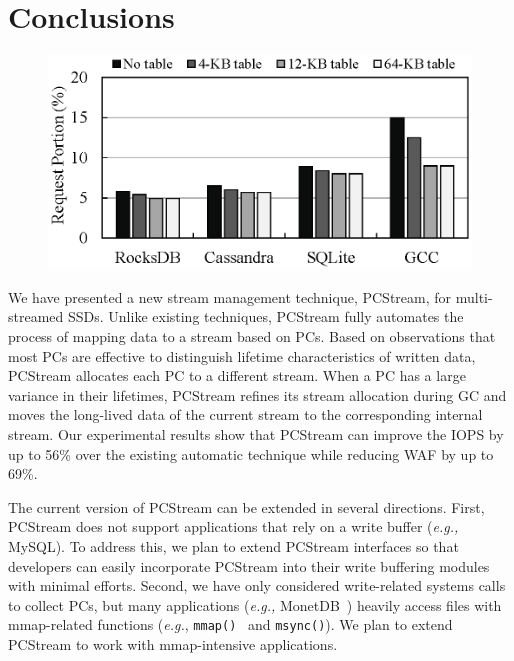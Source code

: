 \vspace{-10pt}
\section{Conclusions}
\vspace{-5pt}

\begin{figure}[t]
	\centering
	\includegraphics[width=0.8\linewidth]{figure/pctable}
	\caption{}
	\vspace{-5pt}
	\label{fig:pctable}
	\vspace{-10pt}
\end{figure}


We have presented a new stream management technique, \textsf{\small PCStream},
for multi-streamed SSDs.  Unlike existing techniques, \textsf{\small PCStream}
fully automates the process of mapping data to a stream based on PCs.  Based on
observations that most PCs are effective to distinguish lifetime
characteristics of written data, \textsf{\small PCStream} allocates each PC to
a different stream.  When a PC has a large variance in their lifetimes,
\textsf{\small PCStream} refines its stream allocation during GC and moves the
long-lived data of the current stream to the corresponding internal stream.
Our experimental results show that \textsf{\small PCStream} can improve the
IOPS by up to 56\% over the existing automatic technique while reducing WAF by
up to 69\%. 

The current version of \textsf{\small PCStream} can be extended in several
directions.  First, \textsf{\small PCStream} does not support applications that
rely on a write buffer ({\it e.g.,} MySQL). To address this, we plan to extend
\textsf{\small PCStream} interfaces so that developers can easily incorporate
\textsf{\small PCStream} into their write buffering modules with minimal
efforts.  Second, we have only considered write-related systems calls to
collect PCs, but many applications ({\it e.g.,} MonetDB~\cite{MonetDB}) heavily
access files with mmap-related functions ({\it e.g.}, \texttt{mmap()}~\cite{mmap} and
\texttt{msync()}).  We plan to extend \textsf{\small PCStream} to work with
mmap-intensive applications. 

